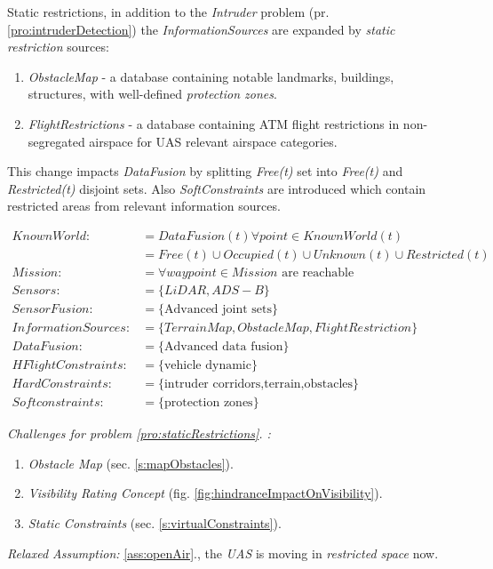 \begin{problem}{Static restrictions}\label{pro:staticRestrictions},
    in addition to the \emph{Intruder} problem (pr. \ref{pro:intruderDetection}) the \emph{InformationSources} are expanded by \emph{static restriction} sources: 
    \begin{enumerate}
        \item \emph{ObstacleMap} - a database containing notable landmarks, buildings, structures, with well-defined \emph{protection zones}.
        \item \emph{FlightRestrictions} - a database containing ATM flight restrictions in non-segregated airspace for UAS relevant airspace categories. 
    \end{enumerate}
    \noindent This change impacts \emph{DataFusion} by splitting \emph{Free(t)} set into \emph{Free(t)} and \emph{Restricted(t)} disjoint sets. Also \emph{SoftConstraints} are introduced which contain restricted areas from relevant information sources.  
    
    \begin{equation}\label{eq:staticRestrictionsProblemDefinition}
        \begin{aligned}
            KnownWorld:&= DataFusion(t)\forall point\in KnownWorld(t)\\
                       &=Free(t) \cup Occupied(t) \cup Unknown(t)\cup Restricted(t)\\
            Mission:&= \forall waypoint\in Mission \text{ are reachable}\\
            Sensors:&= \{LiDAR,ADS-B\}\\
            SensorFusion:&= \{\text{Advanced joint sets}\}\\
            InformationSources:&=\{Terrain Map,Obstacle Map,Flight Restriction\}\\
            DataFusion:&= \{\text{Advanced data fusion}\}\\
            HFlightConstraints:&=\{\text{vehicle dynamic}\}\\
            HardConstraints:&=\{\text{intruder corridors,terrain,obstacles}\}\\
            Softconstraints:&=\{\text{protection zones}\}
        \end{aligned}
    \end{equation}
    

    \noindent \emph{Challenges for problem  \ref{pro:staticRestrictions}. :}
    \begin{enumerate}
        \item \emph{Obstacle Map} (sec. \ref{s:mapObstacles}).
        \item \emph{Visibility Rating Concept} (fig. \ref{fig:hindranceImpactOnVisibility}).
        \item \emph{Static Constraints} (sec. \ref{s:virtualConstraints}).
    \end{enumerate}

    \noindent \emph{Relaxed Assumption: } \ref{ass:openAir}., the \emph{UAS} is moving in \emph{restricted space} now.
\end{problem}

